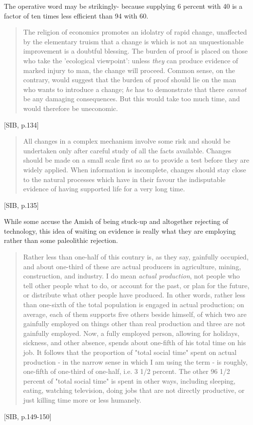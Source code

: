 The operative word may be strikingly- because supplying 6 percent with 40 is a factor of ten times less efficient than 94 with 60.

\begin{quote}
  The religion of economics promotes an idolatry of rapid change, unaffected by the elementary truism that a change is which is not an unquestionable improvement is a doubtful blessing. The burden of proof is placed on those who take the 'ecological viewpoint': unless \textit{they} can produce evidence of marked injury to man, the change will proceed. Common sense, on the contrary, would suggest that the burden of proof should lie on the man who wants to introduce a change; \textit{he} has to demonstrate that there \textit{cannot} be any damaging consequences. But this would take too much time, and would therefore be uneconomic.
\end{quote}[SIB, p.134]

\begin{quote}
  All changes in a complex mechanism involve some risk and should be undertaken only after careful study of all the facts available. Changes should be made on a small scale first so as to provide a test before they are widely applied. When information is incomplete, changes should stay close to the natural processes which have in their favour the indisputable evidence of having supported life for a very long time.
\end{quote}[SIB, p.135]

While some accuse the Amish of being stuck-up and altogether rejecting of technology, this idea of waiting on evidence is really what they are employing rather than some paleolithic rejection.

\begin{quote}
  Rather less than one-half of this coutnry is, as they say, gainfully occupied, and about one-third of these are actual producers in agriculture, mining, construction, and industry. I do mean \textit{actual production}, not people who tell other people what to do, or account for the past, or plan for the future, or distribute what other people have produced. In other words, rather less than one-sixth of the total population is engaged in actual production; on average, each of them supports five others beside himself, of which two are gainfully employed on things other than real production and three are not gainfully employed. Now, a fully employed person, allowing for holidays, sickness, and other absence, spends about one-fifth of his total time on his job. It follows that the proportion of "total social time" spent on actual production - in the narrow sense in which I am using the term - is roughly, one-fifth of one-third of one-half, i.e. 3 1/2 percent. The other 96 1/2 percent of "total social time" is spent in other ways, including sleeping, eating, watching television, doing jobs that are not directly productive, or just killing time more or less humanely.
\end{quote} [SIB, p.149-150]

